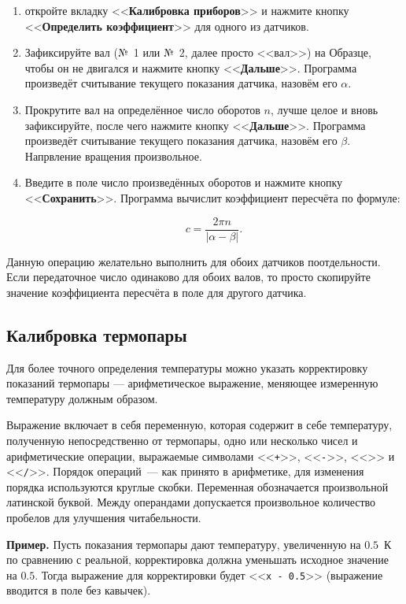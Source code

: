 \documentclass[12pt, a4paper, twocolumn]{report}
\newcommand{\CTL}[1]{<<{\bf #1}>>}
\newcommand{\CMD}[1]{<<{\tt #1}>>}
\begin{document}
\begin{enumerate}
\item откройте вкладку \CTL{Калибровка приборов} и нажмите кнопку \CTL{Определить коэффициент} для одного из датчиков.

\item Зафиксируйте вал (№~1 или №~2, далее просто <<вал>>) на Образце, чтобы он не двигался и нажмите кнопку \CTL{Дальше}. Программа произведёт считывание текущего показания датчика, назовём его $\alpha$.

\item Прокрутите вал на определённое число оборотов $n$, лучше целое и вновь зафиксируйте, после чего нажмите кнопку \CTL{Дальше}. Программа произведёт считывание текущего показания датчика, назовём его $\beta$. Напрвление вращения произвольное.

\item Введите в поле число произведённых оборотов и нажмите кнопку \CTL{Сохранить}. Программа вычислит коэффициент пересчёта по формуле:

\begin{equation}
c = \frac{2 \pi n}{ |\alpha - \beta| }.
\end{equation}

\end{enumerate}

Данную операцию желательно выполнить для обоих датчиков поотдельности. Если передаточное число одинаково для обоих валов, то просто скопируйте значение коэффициента пересчёта в поле для другого датчика.

\subsection{Калибровка термопары}

Для более точного определения температуры можно указать корректировку показаний термопары --- арифметическое выражение, меняющее измеренную температуру должным образом.

Выражение включает в себя переменную, которая содержит в себе температуру, полученную непосредственно от термопары, одно или несколько чисел и арифметические операции, выражаемые символами \CMD{+}, \CMD{-}, \CMD{*} и \CMD{/}. Порядок операций~--- как принято в арифметике, для изменения порядка используются круглые скобки. Переменная обозначается произвольной латинской буквой. Между операндами допускается произвольное количество пробелов для улучшения читабельности.

{\bf Пример. } Пусть показания термопары дают температуру, увеличенную на $0.5$~К по сравнению с реальной, корректировка должна уменьшать исходное значение на $0.5$. Тогда выражение для корректировки будет \mbox{\CMD{x - 0.5}} (выражение вводится в поле без кавычек).
\end{document}
